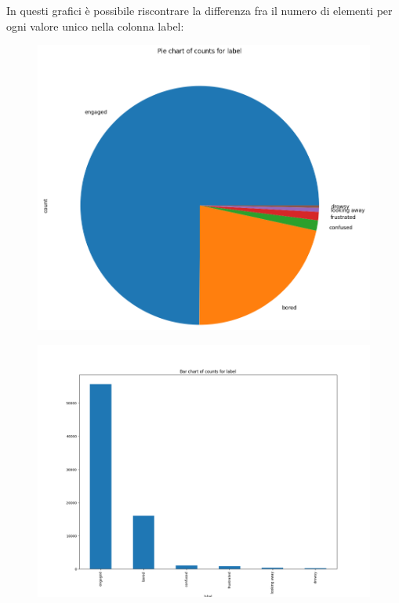 In questi grafici è possibile riscontrare la differenza fra il numero di elementi per ogni valore unico nella colonna label:
\begin{figure}
    \begin{center}    
        \includegraphics[width=0.8\linewidth]{images/image43.png}
    \end{center}
\end{figure}
\begin{figure}
    \begin{center}    
        \includegraphics[width=0.8\linewidth]{images/image44.png}
    \end{center}
\end{figure}

